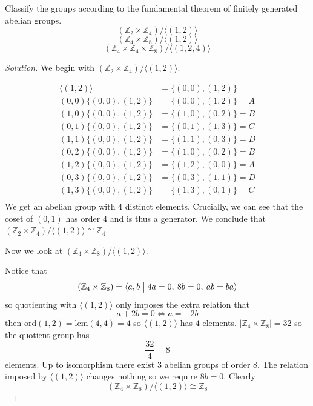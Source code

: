 \begin{prob}
    Classify the groups according to the fundamental theorem of 
    finitely generated abelian groups.
    \[
        (\mathbb Z_2 \times \mathbb Z_4)/\langle(1,2)\rangle
    \]
    \[
        (\mathbb Z_4 \times \mathbb Z_8)/\langle(1,2)\rangle
    \]
    \[ 
        (\mathbb Z_4 \times \mathbb Z_4 \times \mathbb Z_8)/
        \langle (1,2,4) \rangle
    \]
\end{prob}
\begin{proof}[Solution]
    We begin with 
    $(\mathbb Z_2 \times \mathbb Z_4)/\langle(1,2)\rangle$. 

    \begin{align*}
        \langle (1,2) \rangle &= \{(0,0), (1,2)\} \\ 
        (0,0) \{(0,0), (1,2)\} &= \{(0,0), (1,2)\} = A \\ 
        (1,0) \{(0,0), (1,2)\} &= \{(1,0), (0,2)\} = B \\ 
        (0,1) \{(0,0), (1,2)\} &= \{(0,1), (1,3)\} = C \\ 
        (1,1) \{(0,0), (1,2)\} &= \{(1,1), (0,3)\} = D \\ 
        (0,2) \{(0,0), (1,2)\} &= \{(1,0), (0,2)\} = B \\ 
        (1,2) \{(0,0), (1,2)\} &= \{(1,2), (0,0)\} = A \\ 
        (0,3) \{(0,0), (1,2)\} &= \{(0,3), (1,1)\} = D \\ 
        (1,3) \{(0,0), (1,2)\} &= \{(1,3), (0,1)\} = C \\ 
    \end{align*}
    We get an abelian group with $4$ distinct elements.
    Crucially, we can see that the coset of $(0,1)$ has order 
    $4$ and is thus a generator. 
    We conclude that $(\mathbb Z_2 \times \mathbb Z_4)/
    \langle (1,2)\rangle \cong \mathbb Z_4$.

    Now we look at $(\mathbb Z_4 \times \mathbb Z_8)/
    \langle(1,2)\rangle$.

    Notice that 
    \[
        (\mathbb Z_4 \times \mathbb Z_8) = \langle a,b 
        \bigm| 4a = 0, \: 8b = 0, \: ab = ba\rangle
    \]
    so quotienting with $\langle(1,2)\rangle$ only imposes 
    the extra relation that 
    \[
        a + 2b = 0 \Leftrightarrow a = -2b
    \]
    then $\text{ord}(1,2) = \text{lcm}(4,4) = 4$ so 
    $\langle (1,2)\rangle$ has $4$ elements.  
    $|\mathbb Z_4 \times \mathbb Z_8| = 32$ so the quotient group has 
    \[
        \frac{32}{4} = 8
    \]
    elements. 
    Up to isomorphism there exist $3$ abelian groups of order 
    $8$.
    The relation imposed by $\langle (1,2)\rangle$ changes nothing 
    so we require $8b = 0$. Clearly 
    \[
        (\mathbb Z_4 \times \mathbb Z_8)/\langle (1,2)\rangle 
        \cong \mathbb Z_8
    \]


\end{proof}
